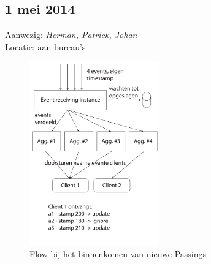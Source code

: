 \subsection*{1 mei 2014}
\label{sec:meeting-1-mei}

Aanwezig: \textit{Herman, Patrick, Johan}\\
Locatie: aan bureau's

\begin{figure}
\centering
\includegraphics[width=0.5\textwidth]{style/images/meeting1mei}
\caption{Flow bij het binnenkomen van nieuwe Passings}
\label{fig:not1mei}
\end{figure}

